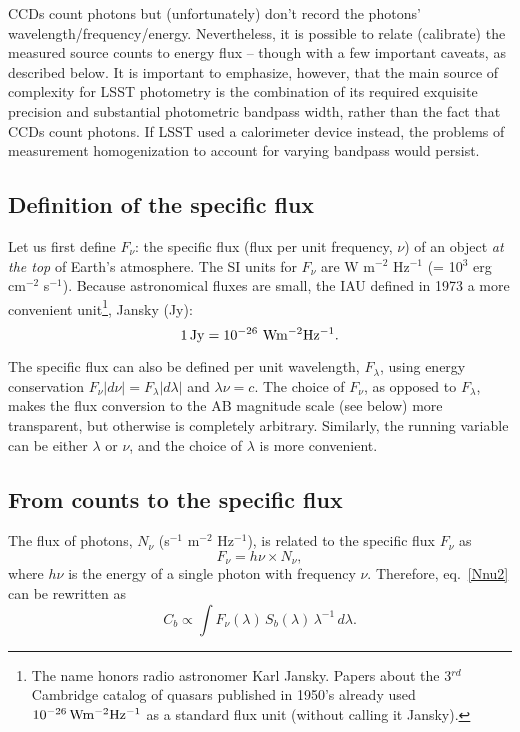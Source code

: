 \documentclass{emulateapj}
\begin{document}
CCDs count photons but (unfortunately) don't record the photons' wavelength/frequency/energy.
Nevertheless, it is possible to relate (calibrate) the measured source counts to energy flux -- though
with a few important caveats, as described below. It is important to emphasize, however, that the main 
source of complexity for LSST photometry is the combination of its required exquisite precision
and substantial photometric bandpass width, rather than the fact that CCDs count photons. If LSST
used a calorimeter device instead, the problems of measurement homogenization to account for varying 
bandpass would persist. 

 

\subsection{Definition of the specific flux} 

Let us first  define $F_\nu$: the specific flux (flux per unit frequency, $\nu$) of an 
object {\it at the top} of Earth's atmosphere. The SI units for $F_\nu$ are 
W m$^{-2}$ Hz$^{-1}$ (= 10$^{3}$ erg cm$^{-2}$ s$^{-1}$). Because astronomical 
fluxes are small, the IAU defined in 1973 a more convenient unit\footnote{The
name honors radio astronomer Karl Jansky. Papers about the 3$^{rd}$ Cambridge 
catalog of quasars published in 1950's already used $10^{-26} \, {\rm W m^{-2} Hz^{-1}}$
as a standard flux unit (without calling it Jansky).},  Jansky (Jy): 
\begin{equation}
            1 \, {\rm Jy} = 10^{-26} \,\, {\rm W m^{-2} Hz^{-1}}.
\end{equation} 

The specific flux can also be defined per unit wavelength, $F_\lambda$, using energy 
conservation $F_\nu |d\nu|=F_\lambda |d\lambda|$ and $\lambda \nu = c$.
The choice of $F_\nu$, as opposed to $F_\lambda$, makes the flux conversion 
to the AB magnitude scale (see below) more transparent, but otherwise is completely
arbitrary. Similarly, the running variable can be either  $\lambda$ or $\nu$, and the 
choice of $\lambda$ is more convenient.



\subsection{From counts to the specific flux} 

The flux of photons, $N_\nu$ (s$^{-1}$ m$^{-2}$ Hz$^{-1}$), is related to the specific flux $F_\nu$ as
\begin{equation}
\label{FNnu}
                 F_\nu = h \nu \times N_\nu,  
\end{equation}
where $h\nu$ is the energy of a single photon with frequency $\nu$. Therefore,
eq.~\ref{Nnu2} can be rewritten as
\begin{equation}
\label{Nnu3}
         C_b\propto \int F_\nu(\lambda) \, S_b(\lambda) \, \lambda^{-1} \, d\lambda. 
\end{equation}
\end{document}
